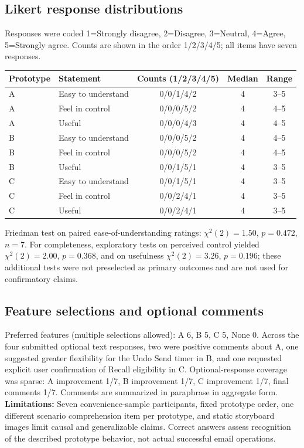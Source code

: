 \documentclass[letterpaper]{jdf}
\begin{document}
\subsection*{Likert response distributions}
Responses were coded 1=Strongly disagree, 2=Disagree, 3=Neutral, 4=Agree, 5=Strongly agree. Counts are shown in the order 1/2/3/4/5; all items have seven responses.
\begin{center}\small\begin{tabular}{llccc}\hline
Prototype & Statement & Counts (1/2/3/4/5) & Median & Range \\ \hline
A & Easy to understand & 0/0/1/4/2 & 4 & 3--5 \\
A & Feel in control & 0/0/0/5/2 & 4 & 4--5 \\
A & Useful & 0/0/0/4/3 & 4 & 4--5 \\
B & Easy to understand & 0/0/0/5/2 & 4 & 4--5 \\
B & Feel in control & 0/0/0/5/2 & 4 & 4--5 \\
B & Useful & 0/0/1/5/1 & 4 & 3--5 \\
C & Easy to understand & 0/0/1/5/1 & 4 & 3--5 \\
C & Feel in control & 0/0/2/4/1 & 4 & 3--5 \\
C & Useful & 0/0/2/4/1 & 4 & 3--5 \\ \hline
\end{tabular}\end{center}
Friedman test on paired ease-of-understanding ratings: $\chi^2(2)=1.50$, $p=0.472$, $n=7$. For completeness, exploratory tests on perceived control yielded $\chi^2(2)=2.00$, $p=0.368$, and on usefulness $\chi^2(2)=3.26$, $p=0.196$; these additional tests were not preselected as primary outcomes and are not used for confirmatory claims.
\subsection*{Feature selections and optional comments}
Preferred features (multiple selections allowed): A 6, B 5, C 5, None 0. Across the four submitted optional text responses, two were positive comments about A, one suggested greater flexibility for the Undo Send timer in B, and one requested explicit user confirmation of Recall eligibility in C. Optional-response coverage was sparse: A improvement 1/7, B improvement 1/7, C improvement 1/7, final comments 1/7. Comments are summarized in paraphrase in aggregate form.
\textbf{Limitations:} Seven convenience-sample participants, fixed prototype order, one different scenario comprehension item per prototype, and static storyboard images limit causal and generalizable claims. Correct answers assess recognition of the described prototype behavior, not actual successful email operations.
\end{document}
